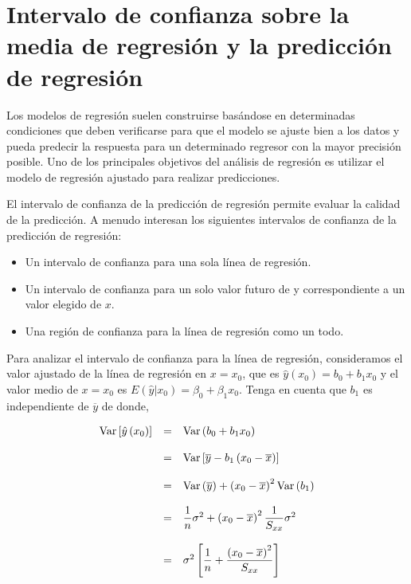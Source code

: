 \section{Intervalo de confianza sobre la media de regresión y la predicción de regresión}

\begin{tcolorbox}
    Los modelos de regresión suelen construirse basándose en determinadas condiciones que deben verificarse para que el modelo se ajuste bien a los datos y pueda predecir la respuesta para un determinado regresor con la mayor precisión posible. Uno de los principales objetivos del análisis de regresión es utilizar el modelo de regresión ajustado para realizar predicciones.
\end{tcolorbox}

El intervalo de confianza de la predicción de regresión permite evaluar la calidad de la predicción. A menudo interesan los siguientes intervalos de confianza de la predicción de regresión:

\begin{itemize}
    \item Un intervalo de confianza para una sola línea de regresión.  
    \item Un intervalo de confianza para un solo valor futuro de y correspondiente a un valor elegido de $x$. 
    \item Una región de confianza para la línea de regresión como un todo.
\end{itemize}

Para analizar el intervalo de confianza para la línea de regresión, consideramos el valor ajustado de la línea de regresión en $x=x_0$, que es $\hat{y}\left(x_0\right)=b_0+b_1x_0$ y el valor medio de $x=x_0$ es $E\left(\hat{y}|x_0\right)=\beta_0+\beta_1x_0$. Tenga en cuenta que $b_1$ es independiente de $\overline{y}$ de donde,

$$
\begin{array}{rcl}
    \mathop{\mbox{\normalfont Var}}\nolimits\left[\hat{y}\left(x_0\right)\right] &=& \mathop{\mbox{\normalfont Var}}\nolimits\left(b_0+b_1x_0\right) \\\\
					     &=& \mathop{\mbox{\normalfont Var}}\nolimits\left[\overline{y}-b_1\left(x_0-\overline{x}\right)\right]\\\\
					     &=& \mathop{\mbox{\normalfont Var}}\nolimits\left(\overline{y}\right)+\left(x_0-\overline{x}\right)^2 \mathop{\mbox{\normalfont Var}}\nolimits\left(b_1\right)\\\\
					     &=& \dfrac{1}{n}\sigma^2+\left(x_0-\overline{x}\right)^2\dfrac{1}{S_{xx}}\sigma^2\\\\
					     &=& \sigma^2\left[\dfrac{1}{n}+\dfrac{\left(x_0-\overline{x}\right)^2}{S_{xx}}\right]
\end{array}
$$

